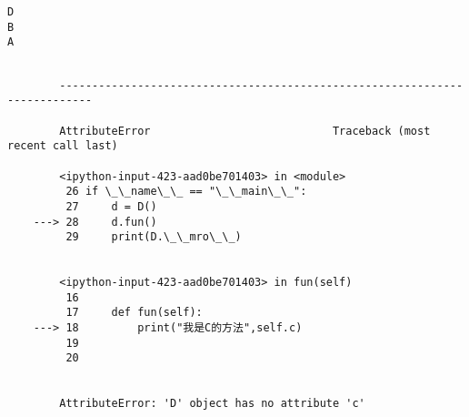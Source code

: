 \documentclass[11pt]{article}
\begin{document}
    \begin{Verbatim}[commandchars=\\\{\}]
D
B
A

    \end{Verbatim}

    \begin{Verbatim}[commandchars=\\\{\}]

        ---------------------------------------------------------------------------

        AttributeError                            Traceback (most recent call last)

        <ipython-input-423-aad0be701403> in <module>
         26 if \_\_name\_\_ == "\_\_main\_\_":
         27     d = D()
    ---> 28     d.fun()
         29     print(D.\_\_mro\_\_)
    

        <ipython-input-423-aad0be701403> in fun(self)
         16 
         17     def fun(self):
    ---> 18         print("我是C的方法",self.c)
         19 
         20 
    

        AttributeError: 'D' object has no attribute 'c'

    \end{Verbatim}
\end{document}
